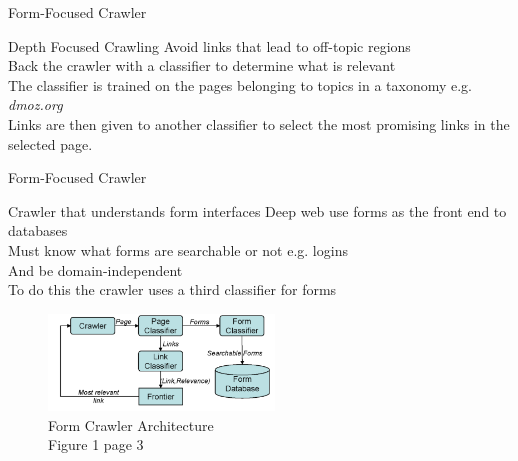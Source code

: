 \documentclass{beamer}
\begin{document}
\begin{frame}{ Form-Focused Crawler}
\begin{block}{Depth Focused Crawling}
Avoid links that lead to off-topic regions \\
Back the crawler with a classifier to determine what is relevant \\
The classifier is trained on the pages belonging to topics in a taxonomy e.g. \emph{dmoz.org} \\
Links are then given to another classifier to select the most promising links in the selected page.
\end{block}
\end{frame} 
\begin{frame}{ Form-Focused Crawler}
\begin{block}{Crawler that understands form interfaces}
Deep web use forms as the front end to databases \\
Must know what forms are searchable or not e.g. logins \\
And be domain-independent \\
To do this the crawler uses a third classifier for forms
\end{block}
\begin{figure}
			\includegraphics[width=6cm]{fca.png}
			\caption{\footnotesize{Form Crawler Architecture} \\ Figure 1 page 3}
		\end{figure}
\end{frame}
\end{document}
